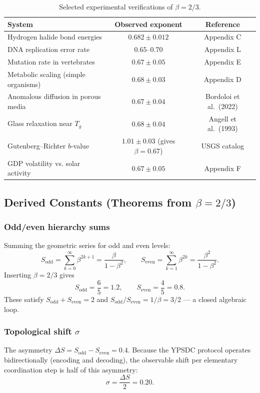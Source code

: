 \documentclass[11pt,a4paper]{article}
\begin{document}
\begin{table}[H]
	\centering
	\caption{Selected experimental verifications of \(\beta = 2/3\).}
	\label{tab:beta-evidence}
	\small
	\begin{tabular}{l c c}
		\toprule
		\textbf{System} & \textbf{Observed exponent} & \textbf{Reference} \\
		\midrule
		Hydrogen halide bond energies & \(0.682 \pm 0.012\) & Appendix C \\
		DNA replication error rate & \(0.65\)–\(0.70\) & Appendix L \\
		Mutation rate in vertebrates & \(0.67 \pm 0.05\) & Appendix E \\
		Metabolic scaling (simple organisms) & \(0.68 \pm 0.03\) & Appendix D \\
		Anomalous diffusion in porous media & \(0.67 \pm 0.04\) & Bordoloi et al.\ (2022) \\
		Glass relaxation near \(T_g\) & \(0.68 \pm 0.04\) & Angell et al.\ (1993) \\
		Gutenberg–Richter \(b\)-value & \(1.01 \pm 0.03\) (gives \(\beta=0.67\)) & USGS catalog \\
		GDP volatility vs. solar activity & \(0.67 \pm 0.05\) & Appendix F \\
		\bottomrule
	\end{tabular}
\end{table}

\subsection{Derived Constants (Theorems from \(\beta = 2/3\))}

\subsubsection{Odd/even hierarchy sums}
Summing the geometric series for odd and even levels:
\[
S_{\mathrm{odd}} = \sum_{k=0}^{\infty} \beta^{2k+1} = \frac{\beta}{1-\beta^2},\qquad
S_{\mathrm{even}} = \sum_{k=1}^{\infty} \beta^{2k} = \frac{\beta^2}{1-\beta^2}.
\]
Inserting \(\beta = 2/3\) gives
\[
\boxed{S_{\mathrm{odd}} = \frac{6}{5}=1.2,\qquad S_{\mathrm{even}} = \frac{4}{5}=0.8}.
\]
These satisfy \(S_{\mathrm{odd}}+S_{\mathrm{even}}=2\) and \(S_{\mathrm{odd}}/S_{\mathrm{even}} = 1/\beta = 3/2\) — a closed algebraic loop.

\subsubsection{Topological shift \(\sigma\)}
The asymmetry \(\Delta S = S_{\mathrm{odd}}-S_{\mathrm{even}} = 0.4\). Because the YPSDC protocol operates bidirectionally (encoding and decoding), the observable shift per elementary coordination step is half of this asymmetry:
\[
\boxed{\sigma = \frac{\Delta S}{2} = 0.20}.
\]
\end{document}

